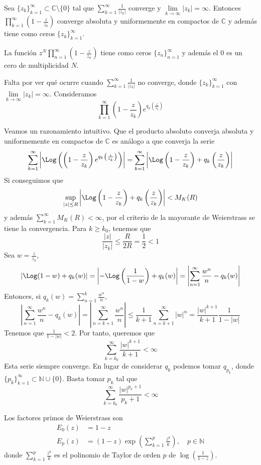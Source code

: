 \begin{theorem}
    Sea $\{z_k\}_{k=1}^\infty \subset \mathbb{C} \setminus \{0\}$ tal que $\sum_{k=1}^\infty \frac{1}{|z_k|}$ converge y $\lim\limits_{k \to \infty} |z_k| = \infty$.
    Entonces $\prod_{k=1}^\infty \left(1-\frac{z}{z_k}\right)$ converge absoluta y uniformemente en compactos de $\mathbb{C}$ y además tiene como ceros $\{z_k\}_{k=1}^\infty$.
\end{theorem}

\begin{remark}
    La función $z^N\prod_{n=1}^\infty \left(1-\frac{z}{z_n}\right)$ tiene como ceros $\{z_n\}_{n=1}^\infty$ y además el 0 es un cero de multiplicidad $N$.
\end{remark}

Falta por ver qué ocurre cuando $\sum_{k=1}^\infty \frac{1}{|z_k|}$ no converge, donde $\{z_k\}_{k=1}^\infty$ con $\lim\limits_{k \to \infty} |z_k| = \infty$.
Consideramos
$$\prod_{k=1}^\infty \left(1-\frac{z}{z_k}\right)e^{q_k\left(\frac{z}{z_k}\right)}$$

Veamos un razonamiento intuitivo.
Que el producto absoluto converja absoluta y uniformemente en compactos de $\mathbb{C}$ es análogo a que converja la serie
$$\sum_{k=1}^\infty \left|\Log\left(\left(1-\frac{z}{z_k}\right)e^{q_k\left(\frac{z}{z_k}\right)}\right)\right| = \sum_{k=1}^\infty \left|\Log\left(1-\frac{z}{z_k}\right) + q_k\left(\frac{z}{z_k}\right)\right|$$
Si conseguimos que
$$\sup_{|z|\leq R} \left|\Log\left(1-\frac{z}{z_k}\right) + q_k\left(\frac{z}{z_k}\right)\right| < M_K(R)$$
y además $\sum_{k=1}^\infty M_K(R) < \infty$, por el criterio de la mayorante de Weierstrass se tiene la convergencia.
Para $k \geq k_0$, tenemos que
$$\frac{|z|}{|z_k|} \leq \frac{R}{2R} = \frac{1}{2} < 1$$
Sea $w = \frac{z}{z_k}$,
$$|\Log(1-w)+q_k(w)| = \left|-\Log\left(\frac{1}{1-w}\right) + q_k(w)\right| = \left|\sum_{n=1}^\infty \frac{w^n}{n} - q_k(w)\right|$$
Entonces, si $q_k(w) = \sum_{n=1}^k \frac{w^n}{n}$,
$$\left|\sum_{n=1}^\infty \frac{w^n}{n} - q_k(w)\right| = \left|\sum_{n=k+1}^\infty \frac{w^n}{n}\right| \leq \frac{1}{k+1}\sum_{n=k+1}^\infty |w|^n = \frac{|w|^{k+1}}{k+1}\frac{1}{1-|w|}$$
Tenemos que $\frac{1}{1-|w|} < 2$.
Por tanto, queremos que
$$\sum_{k=k_0}^\infty \frac{|w|^{k+1}}{k+1} < \infty$$
Esta serie siempre converge.
En lugar de considerar $q_k$ podemos tomar $q_{p_k}$, donde $\{p_k\}_{k=1}^\infty \subset \mathbb{N} \cup \{0\}$.
Basta tomar $p_k$ tal que
$$\sum_{k=k_0}^\infty \frac{|w|^{p_k+1}}{p_k+1} < \infty$$

\begin{definition}
    Los factores primos de Weierstrass son
    \begin{align*}
        E_0(z) & = 1-z                                                                      \\
        E_p(z) & = (1-z)\exp\left(\sum_{k=1}^p \frac{z^k}{k}\right), \quad p \in \mathbb{N}
    \end{align*}
    donde $\sum_{k=1}^p \frac{z^k}{k}$ es el polinomio de Taylor de orden $p$ de $\log\left(\frac{1}{1-z}\right)$.
\end{definition}

